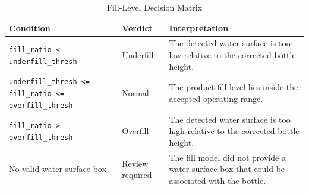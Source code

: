 \documentclass[12pt,a4paper]{report}
\begin{document}
\begin{table}[!ht]
\centering
\caption{Fill-Level Decision Matrix}
\label{tab:fill-decision-matrix}
\begin{tabularx}{\textwidth}{|P{4.2cm}|P{3.2cm}|Y|}
\hline
\textbf{Condition} & \textbf{Verdict} & \textbf{Interpretation} \\
\hline
\texttt{fill\_ratio < underfill\_thresh} & Underfill & The detected water surface is too low relative to the corrected bottle height. \\
\hline
\texttt{underfill\_thresh <= fill\_ratio <= overfill\_thresh} & Normal & The product fill level lies inside the accepted operating range. \\
\hline
\texttt{fill\_ratio > overfill\_thresh} & Overfill & The detected water surface is too high relative to the corrected bottle height. \\
\hline
No valid water-surface box & Review required & The fill model did not provide a water-surface box that could be associated with the bottle. \\
\hline
\end{tabularx}
\end{table}

\printbibliography[title={References}]
\end{document}
